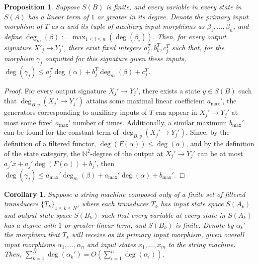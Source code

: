 \documentclass{article}
\newtheorem{corollary}{Corollary}[theorem]
\newtheorem{proposition}[theorem]{Proposition}
\theoremstyle{definition}
\theoremstyle{remark}
\begin{document}
\begin{proposition}
    \label{prop:finstateslinearoutput}
    Suppose $S(B)$ is finite,
    and every variable in every state in $S(A)$ has
    a linear term of $1$ or greater in its degree.
    Denote the primary input
    morphism of $T$ as $\alpha$
    and its tuple of auxiliary input morphisms as
    $\beta_1,\dots,\beta_n$, and define
    $\deg_m(\beta) := \max_{1\leq i \leq n}(\deg(\beta_i))$. Then,
    for every output signature $X'_j\to Y_j'$, there exist
    fixed integers
    $a^{T}_j, b^T_k, c^T_j$ such that, for the morphism
    $\gamma_j$ outputted for this signature given these inputs,
    $\deg(\gamma_j) \leq a^T_j \deg(\alpha)+b^T_j \deg_m(\beta)+c^T_j$.
\end{proposition}
\begin{proof}
For every
output signature $X_j'\to Y_j'$, there exists a state $y \in S(B)$
such that $\deg_{B,y}(X_j'\to Y_j')$
attains some maximal linear
coefficient $a_{\max}'$, the generators corresponding
to auxiliary inputs of $T$ can appear in $X_j'\to Y_j'$
at most some fixed
$a_{\max}'$ number of times. Additionally,
a similar maximum $b_{\max}'$ can be found for the constant term
of $\deg_{B,y}(X_j'\to Y_j')$. Since, by the definition of a filtered
functor, $\deg(F(\alpha)) \leq \deg(\alpha)$, and by the definition
of the state category, the $\mathbb{N}^2$-degree of the output at
$X_j'\to Y_j'$ can be at most $a_j'x+a_j'\deg(F(\alpha))+b_j'$, then
$\deg(\gamma_j) \leq a_{\max}'\deg_m(\beta)+a_{\max}'\deg(\alpha)+
b_{\max}'$.
\end{proof}

\begin{corollary}
\label{corr:linearruntime} Suppose a string machine composed
only of a finite set of filtered transducers $\{T_k\}_{1\leq k
\leq N}$, where
each transducer $T_k$ has input state space $S(A_k)$ and output
state space $S(B_k)$ such that every variable at every state in
$S(A_k)$ has a degree with $1$ or greater linear term, and
$S(B_k)$ is finite. Denote by $\alpha_k'$ the morphism that
$T_k$ will receive as its primary input morphism, given overall
input morphisms $\alpha_1,\dots,\alpha_n$ and
input states $x_1,\dots,x_m$ to the string machine.  Then,
$\sum_{k=1}^N \deg(\alpha_k') = O\left(\sum_{i=1}^n
\deg(\alpha_i)\right)$.
\end{corollary}
\end{document}
